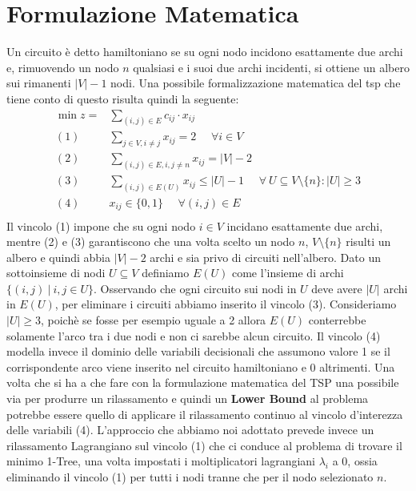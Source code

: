 \documentclass[
	article,			%
	12pt,				%
	oneside,			%
	a4paper,			%
	english,			%
	italian,				%
	sumario=tradicional,
	]{abntex2}
\begin{document}
\section{Formulazione Matematica}
Un circuito è detto hamiltoniano se su ogni nodo incidono esattamente due archi e, rimuovendo un nodo $n$ qualsiasi e i suoi due archi incidenti, si ottiene un albero sui rimanenti $|V| - 1$ nodi. Una possibile formalizzazione matematica del tsp che tiene conto di questo risulta quindi la seguente:
\begin{equation*}
    \begin{split}
        \min z = & \sum_{(i,j) \in E} c_{ij} \cdot x_{ij}\\
        (1)\:\:\:\:\:\: & \sum_{j \in V, i \neq j} x_{ij} = 2 \:\:\:\:\:\: \forall i \in V \\
        (2) \:\:\:\:\:\: & \sum_{(i,j)\in E, i, j \neq n} x_{ij} = |V|-2 \\
        (3) \:\:\:\:\:\: & \sum_{(i,j) \in E(U)} x_{ij} \leq |U| - 1 \:\:\:\:\:\: \forall\: U \subseteq V\setminus\{n\} : |U| \geq 3 \\
        (4) \:\:\:\:\:\: & x_{ij} \in \{0,1\} \:\:\:\:\:\: \forall (i,j) \in E\\
    \end{split}
\end{equation*}
Il vincolo (1) impone che su ogni nodo $i \in V$ incidano esattamente due archi, mentre (2) e (3) garantiscono che una volta scelto un nodo $n$, $V \setminus \{n\}$ risulti un albero e quindi abbia $|V|-2$ archi e sia privo di circuiti nell'albero. 
\newline
Dato un sottoinsieme di nodi $U \subseteq V$ definiamo $E(U)$ come l'insieme di archi $\{ (i,j) \:|\: i,j \in U \}$.  Osservando che ogni circuito sui nodi in $U$ deve avere $|U|$ archi in $E(U)$, per eliminare i circuiti abbiamo inserito il vincolo (3). Consideriamo $|U| \geq 3$, poichè se fosse per esempio uguale a 2 allora $E(U)$ conterrebbe solamente l'arco tra i due nodi e non ci sarebbe alcun circuito. Il vincolo (4) modella invece il dominio delle variabili decisionali che assumono valore 1 se il corrispondente arco viene inserito nel circuito hamiltoniano e 0 altrimenti.
\newline
Una volta che si ha a che fare con la formulazione matematica del TSP una possibile via per produrre un rilassamento e quindi un \textbf{Lower Bound} al problema potrebbe essere quello di applicare il rilassamento continuo al vincolo d'interezza delle variabili (4).
\newline
L'approccio che abbiamo noi adottato prevede invece un rilassamento Lagrangiano sul vincolo (1) che ci conduce al problema di trovare il minimo 1-Tree, una volta impostati i moltiplicatori lagrangiani $\lambda_i$ a 0, ossia eliminando il vincolo (1) per tutti i nodi tranne che per il nodo selezionato $n$.
\end{document}
